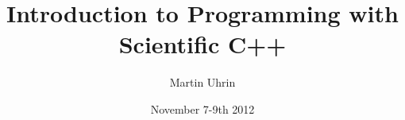 \newenvironment{dontblocke}[1]{%
  \begin{varblock}{\textbf{Don't}}%
  {bg=dontblockbg,fg=dontblocktext}{bg=dontblocktext,fg=white}
  \lstset{backgroundcolor=}%
  #1}%
  {\end{varblock}} %

\newcommand{\dontblock}[1]{%
 \begin{varblock}{\textbf{Don't}}{bg=dontblockbg,fg=dontblocktext}{bg=dontblockbg,fg=dontblocktext}
 #1
 \end{varblock} 
}

\newcommand{\defiblock}[2]{%
 \begin{varblock}{\textbf{Definition}}%
 {bg=defiblockbg,fg=defiblocktext}{bg=defiblocktext,fg=white}
  \begin{tabular}{ll}\textit{#1} & #2\end{tabular}
 \end{varblock} 
}

\newcommand{\warnblock}[1]{%
 \begin{varblock}{\textbf{Warning!}}{bg=warnblockbg,fg=warnblocktext}{bg=warnblockbg,fg=warnblocktext}
  #1
 \end{varblock} 
}

\newcommand{\cout}[1]{%
 Output: \pbox[t]{\textwidth}{\ttfamily\fontsize{9}{10}\selectfont{}#1}
}



\title{Introduction to Programming with Scientific C++}
\author{Martin Uhrin}
\date{November 7-9th 2012}